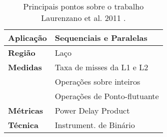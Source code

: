 \documentclass[conference,letter,10pt,final]{IEEEtran}
\begin{document}
\begin{table}[h]
\centering
\caption{Principais pontos sobre o trabalho Laurenzano et al. 2011 \cite{laurenzano2011reducing}.}
\begin{tabular}{|l|l|}
\hline
\textbf{Aplicação} & Sequenciais e Paralelas \\
\hline
\textbf{Região} & Laço\\
\hline
\textbf{Medidas} & Taxa de misses da L1 e L2\\
& Operações sobre inteiros  \\
& Operações de Ponto-flutuante  \\
\hline
\textbf{Métricas} & Power Delay Product \\
\hline
\textbf{Técnica} & Instrument. de Binário \\
\hline
\end{tabular}
\end{table}




\end{document}
